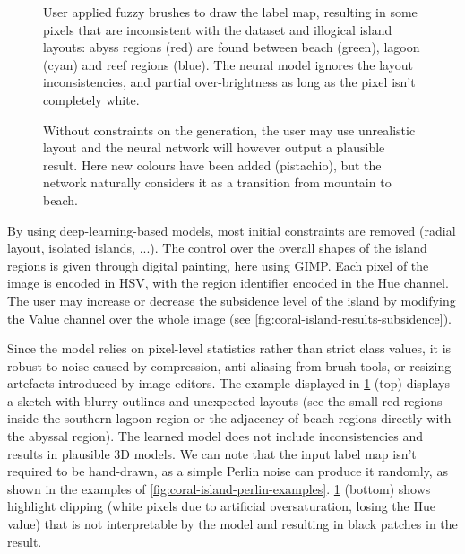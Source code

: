 \begin{figure}
    \caption[Output of the cGAN on fuzzy inputs]{User applied fuzzy brushes to draw the label map, resulting in some pixels that are inconsistent with the dataset and illogical island layouts: abyss regions (red) are found between beach (green), lagoon (cyan) and reef regions (blue). The neural model ignores the layout inconsistencies, and partial over-brightness as long as the pixel isn't completely white.}
    \label{fig:coral-island-results-fuzzy}
\end{figure}
\begin{figure}
    \caption[Output of the cGAN with new colors in the input]{Without constraints on the generation, the user may use unrealistic layout and the neural network will however output a plausible result. Here new colours have been added (pistachio), but the network naturally considers it as a transition from mountain to beach.}
    \label{fig:coral-island-results_dino}
\end{figure}

By using deep-learning-based models, most initial constraints are removed (radial layout, isolated islands, ...). The control over the overall shapes of the island regions is given through digital painting, here using GIMP. Each pixel of the image is encoded in HSV, with the region identifier encoded in the Hue channel. The user may increase or decrease the subsidence level of the island by modifying the Value channel over the whole image (see \cref{fig:coral-island-results-subsidence}).

Since the model relies on pixel-level statistics rather than strict class values, it is robust to noise caused by compression, anti-aliasing from brush tools, or resizing artefacts introduced by image editors. The example displayed in \cref{fig:coral-island-results-fuzzy} (top) displays a sketch with blurry outlines and unexpected layouts (see the small red regions inside the southern lagoon region or the adjacency of beach regions directly with the abyssal region). The learned model does not include inconsistencies and results in plausible 3D models. We can note that the input label map isn't required to be hand-drawn, as a simple Perlin noise can produce it randomly, as shown in the examples of \cref{fig:coral-island-perlin-examples}. \cref{fig:coral-island-results-fuzzy} (bottom) shows highlight clipping (white pixels due to artificial oversaturation, losing the Hue value) that is not interpretable by the model and resulting in black patches in the result. 

